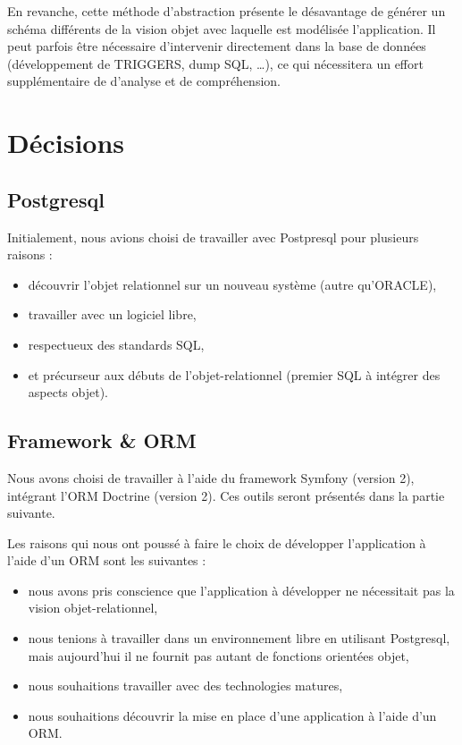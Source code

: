 En revanche, cette méthode d'abstraction présente le désavantage de générer un schéma différents de la vision objet avec laquelle est modélisée l'application. Il peut parfois être nécessaire d'intervenir directement dans la base de données (développement de TRIGGERS, dump SQL, \ldots), ce qui nécessitera un effort supplémentaire de d'analyse et de compréhension.

\section{Décisions}

\subsection{Postgresql}

Initialement, nous avions choisi de travailler avec Postpresql pour plusieurs raisons :
\begin{itemize}
\item découvrir l'objet relationnel sur un nouveau système (autre qu'ORACLE),
\item travailler avec un logiciel libre,
\item respectueux des standards SQL,
\item et précurseur aux débuts de l'objet-relationnel (premier SQL à intégrer des aspects objet).
\end{itemize}

\subsection{Framework \& ORM}

Nous avons choisi de travailler à l'aide du framework Symfony (version 2), intégrant l'ORM Doctrine (version 2). Ces outils seront présentés dans la partie suivante.

Les raisons qui nous ont poussé à faire le choix de développer l'application à l'aide d'un ORM sont les suivantes :
\begin{itemize}
\item nous avons pris conscience que l'application à développer ne nécessitait pas la vision objet-relationnel,
\item nous tenions à travailler dans un environnement libre en utilisant Postgresql, mais aujourd'hui il ne fournit pas autant de fonctions orientées objet,
\item nous souhaitions travailler avec des technologies matures,
\item nous souhaitions découvrir la mise en place d'une application à l'aide d'un ORM.
\end{itemize}
	
